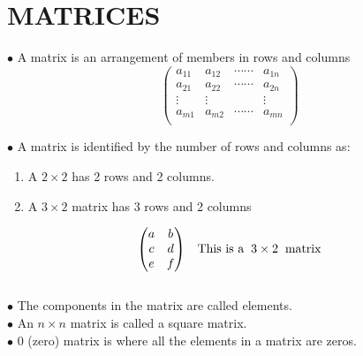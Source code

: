 \documentclass[11pt,a4paper]{article}
\begin{document}
\pagebreak
\section{MATRICES}
$\bullet$ A matrix is an arrangement of members in rows and columns
$$
\begin{pmatrix}
a_{11} & a_{12} & \cdots \cdots & a_{1n}\\
a_{21} & a_{22} & \cdots \cdots & a_{2n}\\
\vdots & \vdots & & \vdots \\
a_{m1} & a_{m2} &  \cdots \cdots & a_{mn}\\
\end{pmatrix}
$$

$\bullet$ A  matrix is identified by the number of rows and columns as:
\begin{enumerate}
\item[] A $2\times 2$ has 2 rows and 2 columns.
\item[]  A $3\times 2$ matrix has 3 rows and 2 columns
\end{enumerate}


$$
\begin{pmatrix}
a&b\\
c&d\\
e&f\\
\end{pmatrix}
\hspace{0.3cm} \text{This is a} \hspace{0.2cm} 3\times 2 \hspace{0.2cm} \text{matrix}$$\\

$\bullet$ The components in the matrix are called elements.\\
$\bullet$ An $n\times n$ matrix is called a square matrix.\\
$\bullet$ 0 (zero) matrix is where all the elements in a matrix are zeros.
\end{document}

